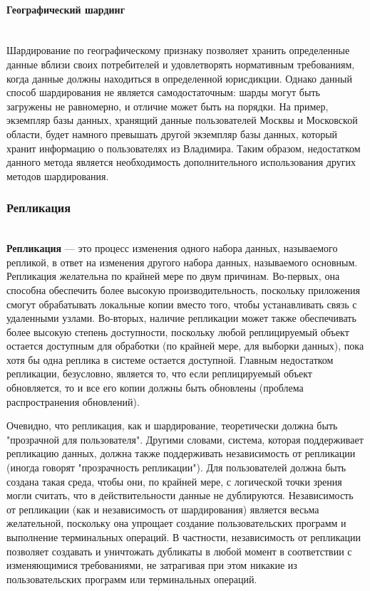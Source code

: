 \paragraph{Географический шардинг} ~\\
Шардирование по географическому признаку позволяет хранить определенные данные вблизи своих потребителей и
удовлетворять нормативным требованиям, когда данные должны находиться в определенной юрисдикции. Однако данный способ
шардирования не является самодостаточным: шарды могут быть загружены не равномерно, и отличие может быть на порядки.
На пример, экземпляр базы данных, хранящий данные пользователей Москвы и Московской области, будет намного превышать
другой экземпляр базы данных, который хранит информацию о пользователях из Владимира. Таким образом, недостатком
данного метода является необходимость дополнительного использования других методов шардирования.

\subsubsection{Репликация} ~\\

\textbf{Репликация} — это процесс изменения одного набора данных, называемого репликой, в ответ на изменения другого
набора данных, называемого основным. Репликация желательна по крайней мере по двум причинам. Во-первых, она способна
обеспечить более высокую производительность, поскольку приложения смогут обрабатывать локальные копии вместо того,
чтобы устанавливать связь с удаленными узлами. Во-вторых, наличие репликации может также обеспечивать более высокую
степень доступности, поскольку любой реплицируемый объект остается доступным для обработки (по крайней мере, для выборки
данных), пока хотя бы одна реплика в системе остается доступной. Главным недостатком репликации, безусловно, является
то, что если реплицируемый объект обновляется, то и все его копии должны быть обновлены (проблема распространения
обновлений).

Очевидно, что репликация, как и шардирование, теоретически должна быть "прозрачной для пользователя". Другими словами,
система, которая поддерживает репликацию данных, должна также поддерживать независимость от репликации (иногда говорят
"прозрачность репликации"). Для пользователей должна быть создана такая среда, чтобы они, по крайней мере, с логической
точки зрения могли считать, что в действительности данные не дублируются. Независимость от репликации (как и
независимость от шардирования) является весьма желательной, поскольку она упрощает создание пользовательских программ и
выполнение терминальных операций. В частности, независимость от репликации позволяет создавать и уничтожать дубликаты в
любой момент в соответствии с изменяющимися требованиями, не затрагивая при этом никакие из пользовательских программ
или терминальных операций.

